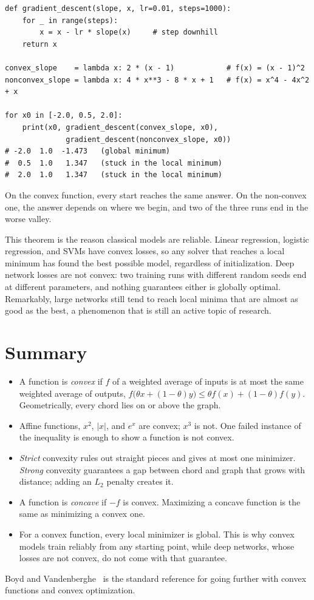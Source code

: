 \begin{lstlisting}
def gradient_descent(slope, x, lr=0.01, steps=1000):
    for _ in range(steps):
        x = x - lr * slope(x)     # step downhill
    return x

convex_slope    = lambda x: 2 * (x - 1)            # f(x) = (x - 1)^2
nonconvex_slope = lambda x: 4 * x**3 - 8 * x + 1   # f(x) = x^4 - 4x^2 + x

for x0 in [-2.0, 0.5, 2.0]:
    print(x0, gradient_descent(convex_slope, x0),
              gradient_descent(nonconvex_slope, x0))
# -2.0  1.0  -1.473   (global minimum)
#  0.5  1.0   1.347   (stuck in the local minimum)
#  2.0  1.0   1.347   (stuck in the local minimum)
\end{lstlisting}

On the convex function, every start reaches the same answer. On the
non-convex one, the answer depends on where we begin, and two of the three
runs end in the worse valley.

\begin{aibox}
  This theorem is the reason classical models are reliable. Linear
  regression, logistic regression, and SVMs have convex losses, so any
  solver that reaches a local minimum has found the best possible model,
  regardless of initialization. Deep network losses are not convex: two
  training runs with different random seeds end at different parameters,
  and nothing guarantees either is globally optimal. Remarkably, large
  networks still tend to reach local minima that are almost as good as
  the best, a phenomenon that is still an active topic of research.
\end{aibox}

\section{Summary}
\label{sec:ch01-summary}

\begin{itemize}
  \item A function is \emph{convex} if $f$ of a weighted average of inputs
    is at most the same weighted average of outputs,
    $f\bigl(\theta x + (1 - \theta) y\bigr) \le \theta f(x) + (1 - \theta) f(y)$.
    Geometrically, every chord lies on or above the graph.
  \item Affine functions, $x^2$, $|x|$, and $e^x$ are convex; $x^3$ is not.
    One failed instance of the inequality is enough to show a function is
    not convex.
  \item \emph{Strict} convexity rules out straight pieces and gives at most
    one minimizer. \emph{Strong} convexity guarantees a gap between chord
    and graph that grows with distance; adding an $L_2$ penalty creates it.
  \item A function is \emph{concave} if $-f$ is convex. Maximizing a
    concave function is the same as minimizing a convex one.
  \item For a convex function, every local minimizer is global. This is why
    convex models train reliably from any starting point, while deep
    networks, whose losses are not convex, do not come with that
    guarantee.
\end{itemize}

Boyd and Vandenberghe~\cite{boyd2004convex} is the standard reference for
going further with convex functions and convex optimization.
